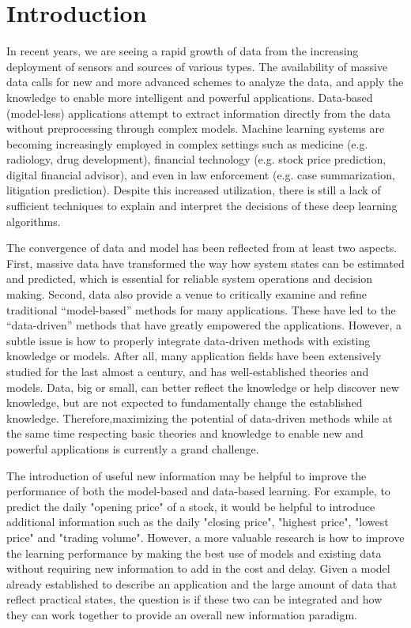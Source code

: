 \section{Introduction}


In recent years, we are seeing a rapid growth of data from the increasing deployment of sensors and sources of various types. The availability of massive data calls for new and more advanced schemes to analyze the data, and apply the knowledge to  enable more intelligent and powerful applications.  Data-based (model-less) applications attempt to extract information directly from the data without preprocessing through complex models. Machine learning systems are becoming increasingly employed in complex  settings such as medicine (e.g. radiology, drug development), financial technology (e.g. stock price prediction, digital financial advisor), and even in law enforcement (e.g. case summarization, litigation prediction). Despite this increased utilization, there is still a lack of sufficient techniques to explain and interpret the decisions of these deep learning algorithms.

The convergence of data and model has been reflected from at least two aspects. First, massive data have transformed the way how system states can be estimated and predicted, which is essential for reliable system operations and decision making. Second, data also provide a venue to critically examine and refine traditional “model-based” methods for many applications. These have led to the “data-driven” methods that have greatly empowered the applications. However, a subtle issue is how to properly integrate data-driven methods with existing knowledge or models. After all, many application fields have been extensively studied for the last almost a century, and has well-established theories and models. Data, big or small, can better reflect the knowledge or help discover new knowledge, but are not expected to fundamentally change the established knowledge. Therefore,maximizing the potential of data-driven methods while at the same time respecting basic theories and knowledge to enable new and powerful applications is currently a grand challenge.

The introduction of useful new information may be helpful to  improve the performance of both the model-based and data-based learning. For example,  to predict the daily "opening price" of a stock\cite{sureshkumar2012performance}\cite{ariyo2014stock}\cite{di2016artificial}, it would be helpful to introduce additional information such as the daily "closing price", "highest price", "lowest price" and "trading volume". However, a more valuable research is how to improve the learning performance by making the best use of models and existing data without requiring new information to add in the cost and delay. Given a model already established to describe an application and the large amount of data that reflect practical states, the question is if these two can be integrated and how they can work together to provide an overall new information paradigm. 

